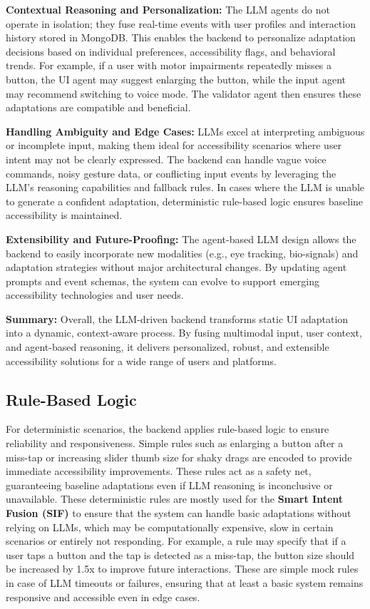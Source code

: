 \documentclass[openany]{book}
\begin{document}
\textbf{Contextual Reasoning and Personalization:}
The LLM agents do not operate in isolation; they fuse real-time events with user profiles and interaction history stored in MongoDB. This enables the backend to personalize adaptation decisions based on individual preferences, accessibility flags, and behavioral trends. For example, if a user with motor impairments repeatedly misses a button, the UI agent may suggest enlarging the button, while the input agent may recommend switching to voice mode. The validator agent then ensures these adaptations are compatible and beneficial.

\textbf{Handling Ambiguity and Edge Cases:}
LLMs excel at interpreting ambiguous or incomplete input, making them ideal for accessibility scenarios where user intent may not be clearly expressed. The backend can handle vague voice commands, noisy gesture data, or conflicting input events by leveraging the LLM’s reasoning capabilities and fallback rules. In cases where the LLM is unable to generate a confident adaptation, deterministic rule-based logic ensures baseline accessibility is maintained.

\textbf{Extensibility and Future-Proofing:}
The agent-based LLM design allows the backend to easily incorporate new modalities (e.g., eye tracking, bio-signals) and adaptation strategies without major architectural changes. By updating agent prompts and event schemas, the system can evolve to support emerging accessibility technologies and user needs.

\textbf{Summary:}
Overall, the LLM-driven backend transforms static UI adaptation into a dynamic, context-aware process. By fusing multimodal input, user context, and agent-based reasoning, it delivers personalized, robust, and extensible accessibility solutions for a wide range of users and platforms.

\subsection{Rule-Based Logic}

 For deterministic scenarios, the backend applies rule-based logic to ensure reliability and responsiveness. Simple rules such as enlarging a button after a miss-tap or increasing slider thumb size for shaky drags are encoded to provide immediate accessibility improvements. These rules act as a safety net, guaranteeing baseline adaptations even if LLM reasoning is inconclusive or unavailable. These deterministic rules are mostly used for the \textbf{Smart Intent Fusion (SIF)} to ensure that the system can handle basic adaptations without relying on LLMs, which may be computationally expensive, slow in certain scenarios or entirely not responding. For example, a rule may specify that if a user taps a button and the tap is detected as a miss-tap, the button size should be increased by 1.5x to improve future interactions. These are simple mock rules in case of LLM timeouts or failures, ensuring that at least a basic system remains responsive and accessible even in edge cases.
\end{document}
